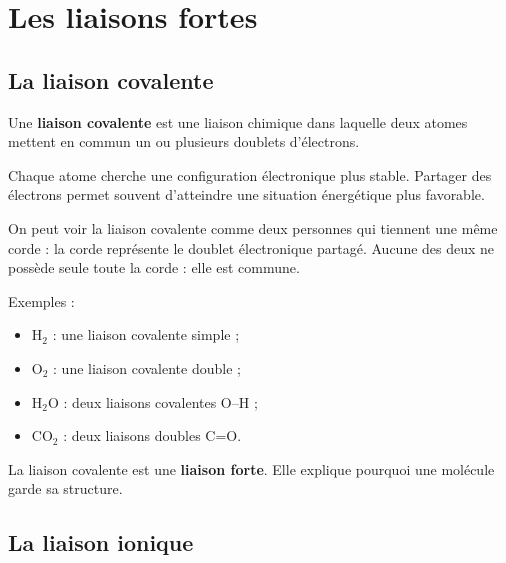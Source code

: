 \documentclass[11pt,a4paper]{article}
\begin{document}
\section{Les liaisons fortes}

\subsection{La liaison covalente}

\begin{definitionbox}
Une \textbf{liaison covalente} est une liaison chimique dans laquelle deux atomes mettent en commun un ou plusieurs doublets d’électrons.
\end{definitionbox}

\begin{ideebox}
Chaque atome cherche une configuration électronique plus stable. Partager des électrons permet souvent d’atteindre une situation énergétique plus favorable.
\end{ideebox}

\begin{analogebox}
On peut voir la liaison covalente comme deux personnes qui tiennent une même corde : la corde représente le doublet électronique partagé.  
Aucune des deux ne possède seule toute la corde : elle est commune.
\end{analogebox}

\begin{exemplebox}
Exemples :
\begin{itemize}
    \item \(\mathrm{H_2}\) : une liaison covalente simple ;
    \item \(\mathrm{O_2}\) : une liaison covalente double ;
    \item \(\mathrm{H_2O}\) : deux liaisons covalentes O--H ;
    \item \(\mathrm{CO_2}\) : deux liaisons doubles C=O.
\end{itemize}
\end{exemplebox}

\begin{comprendrebox}
La liaison covalente est une \textbf{liaison forte}.  
Elle explique pourquoi une molécule garde sa structure.
\end{comprendrebox}

\subsection{La liaison ionique}
\end{document}
